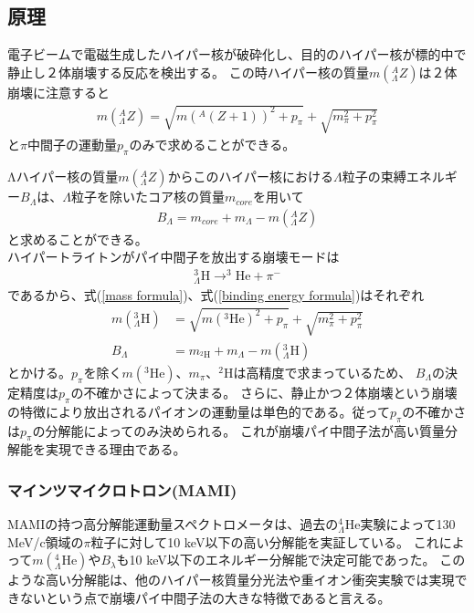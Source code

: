 \documentclass[a4paper,11pt,uplatex]{jsbook}
\begin{document}
\subsection{原理}\label{sec:dps principle}
電子ビームで電磁生成したハイパー核が破砕化し、目的のハイパー核が標的中で静止し２体崩壊する反応を検出する。
この時ハイパー核の質量$m(^A_{\Lambda}Z)$は２体崩壊に注意すると
\begin{eqnarray}
  m(^A_{\Lambda}Z) = \sqrt{m(^A(Z+1))^2 + p_\pi} + \sqrt{m_\pi^2 + p_\pi^2} \label{mass formula}
\end{eqnarray}
と$\pi$中間子の運動量$p_\pi$のみで求めることができる。

Λハイパー核の質量$m(^A_\Lambda Z)$からこのハイパー核における$\Lambda$粒子の束縛エネルギー$B_\Lambda$は、$\Lambda$粒子を除いたコア核の質量$m_{core}$を用いて
\begin{eqnarray}
  B_\Lambda = m_{core} + m_\Lambda - m(^A_\Lambda Z) \label{binding energy formula}
\end{eqnarray}
と求めることができる。
\\ハイパートライトンがパイ中間子を放出する崩壊モードは
\begin{eqnarray}
  ^3_{\Lambda}\text{H} \rightarrow ^3\text{He} + \pi^-
\end{eqnarray}
であるから、式(\ref{mass formula})、式(\ref{binding energy formula})はそれぞれ
\begin{eqnarray}
  m(^3_\Lambda \text{H}) &= \sqrt{m(^3\text{He})^2 + p_\pi} + \sqrt{m_\pi^2 + p_\pi^2} \\
  B_\Lambda &= m_{^2\text{H}} + m_\Lambda - m(^3_\Lambda \text{H})
\end{eqnarray}
とかける。$p_\pi$を除く$m(^3\text{He})$、$m_\pi$、$^2\text{H}$は高精度で求まっているため、
$B_\Lambda$の決定精度は$p_\pi$の不確かさによって決まる。
さらに、静止かつ２体崩壊という崩壊の特徴により放出されるパイオンの運動量は単色的である。従って$p_\pi$の不確かさは$p_\pi$の分解能によってのみ決められる。
これが崩壊パイ中間子法が高い質量分解能を実現できる理由である。
\subsubsection{マインツマイクロトロン(MAMI)}
MAMIの持つ高分解能運動量スペクトロメータは、過去の$^4_\Lambda \text{He}$実験によって130 MeV/c領域の$\pi$粒子に対して10 keV以下の高い分解能を実証している。
これによって$m(^4_\Lambda \text{He})$や$B_\lambda$も10 keV以下のエネルギー分解能で決定可能であった。
このような高い分解能は、他のハイパー核質量分光法や重イオン衝突実験では実現できないという点で崩壊パイ中間子法の大きな特徴であると言える。
\end{document}
